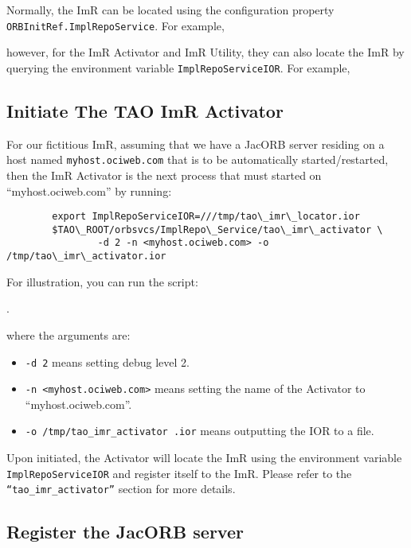 Normally, the ImR can be located using the configuration  property
{\tt ORBInitRef.ImplRepoService}.  For example,


however, for the ImR Activator and ImR Utility,  they can also locate
the ImR by querying the environment variable {\tt ImplRepoServiceIOR}.
For example,


\subsection{Initiate The TAO ImR Activator}

For our fictitious ImR, assuming that we have a JacORB server residing
on a host named {\tt myhost.ociweb.com} that is to be automatically started/restarted,
then the ImR Activator is the next process that must started on
“myhost.ociweb.com” by running:

\begin{verbatim}
        export ImplRepoServiceIOR=///tmp/tao\_imr\_locator.ior
        $TAO\_ROOT/orbsvcs/ImplRepo\_Service/tao\_imr\_activator \
                -d 2 -n <myhost.ociweb.com> -o /tmp/tao\_imr\_activator.ior
\end{verbatim}

For illustration, you can run the script:

.

where the arguments are:
\begin{itemize}
    \item {\tt -d 2} means setting debug level 2.
    \item {\tt -n <myhost.ociweb.com>} means setting the name of the Activator to
              “myhost.ociweb.com”.
    \item {\tt -o /tmp/tao\_imr\_activator .ior} means outputting the IOR to a file.
\end{itemize}


Upon initiated, the Activator will locate the ImR using the environment
variable {\tt ImplRepoServiceIOR} and register itself to the ImR.  Please
refer to the {\tt “tao_imr_activator”} section for more details.

\subsection{Register the JacORB server}

